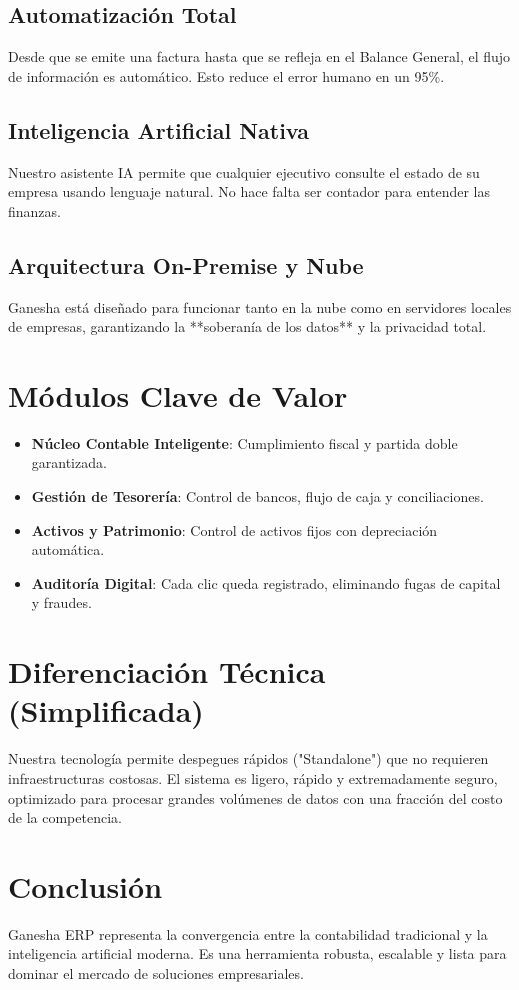 \documentclass[a4paper,12pt]{article}
\begin{document}
\subsection{Automatización Total}
Desde que se emite una factura hasta que se refleja en el Balance General, el flujo de información es automático. Esto reduce el error humano en un 95\%.

\subsection{Inteligencia Artificial Nativa}
Nuestro asistente IA permite que cualquier ejecutivo consulte el estado de su empresa usando lenguaje natural. No hace falta ser contador para entender las finanzas.

\subsection{Arquitectura On-Premise y Nube}
Ganesha está diseñado para funcionar tanto en la nube como en servidores locales de empresas, garantizando la **soberanía de los datos** y la privacidad total.

\section{Módulos Clave de Valor}
\begin{itemize}
    \item \textbf{Núcleo Contable Inteligente}: Cumplimiento fiscal y partida doble garantizada.
    \item \textbf{Gestión de Tesorería}: Control de bancos, flujo de caja y conciliaciones.
    \item \textbf{Activos y Patrimonio}: Control de activos fijos con depreciación automática.
    \item \textbf{Auditoría Digital}: Cada clic queda registrado, eliminando fugas de capital y fraudes.
\end{itemize}

\section{Diferenciación Técnica (Simplificada)}
Nuestra tecnología permite despegues rápidos ("Standalone") que no requieren infraestructuras costosas. El sistema es ligero, rápido y extremadamente seguro, optimizado para procesar grandes volúmenes de datos con una fracción del costo de la competencia.

\section{Conclusión}
Ganesha ERP representa la convergencia entre la contabilidad tradicional y la inteligencia artificial moderna. Es una herramienta robusta, escalable y lista para dominar el mercado de soluciones empresariales.
\end{document}
